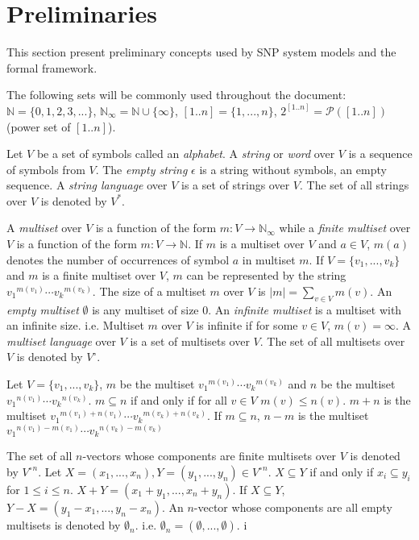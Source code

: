 \documentclass[a4paper]{article}
\theoremstyle{definition}
\newcommand{\ra}{\rightarrow}
\begin{document}

\section{Preliminaries}\label{sec-preliminaries}

This section present preliminary concepts used by SNP system models and the formal framework.

The following sets will be commonly used throughout the document: $\mathbb{N} = \{0,1,2,3,...\}$,
$\mathbb{N}_{\infty} = \mathbb{N} \cup \{\infty\}$, $[1..n] = \{1,...,n\}$, 
$2^{[1..n]}=\mathcal{P}([1..n])$ (power set of $[1..n]$).

Let $V$ be a set of symbols called an \emph{alphabet}. A \emph{string} or \emph{word} over $V$ is
a sequence of symbols from $V$. The \emph{empty string} $\epsilon$ is a string without symbols, an 
empty sequence. A \emph{string language} over $V$ is a set of strings over $V$. The set of all 
strings over $V$ is denoted by $V^*$.

A \emph{multiset} over $V$ is a function of the form $m: V \ra \mathbb{N}_{\infty}$ while a
\emph{finite multiset} over $V$ is a function of the form $m: V \ra \mathbb{N}$. If $m$ is a
multiset over $V$ and $a \in V$, $m(a)$ denotes the number of occurrences of symbol $a$ in multiset
$m$. If $V=\{v_1,...,v_k\}$ and $m$ is a finite multiset over $V$, $m$ can be represented by the
string ${v_1}^{m(v_1)}\cdots {v_k}^{m(v_k)}$. The size of a multiset $m$ over $V$ is
$|m| = \sum_{v\in V}m(v)$. An \emph{empty multiset} $\emptyset$ is any multiset of size $0$. An
\emph{infinite multiset} is a multiset with an infinite size. i.e. Multiset $m$ over $V$ is infinite
if for some $v\in V$, $m(v) = \infty$. A \emph{multiset language} over $V$ is a set of multisets 
over $V$. The set of all multisets over $V$ is denoted by $V^{\circ}$.

Let $V=\{v_1,...,v_k\}$, $m$ be the multiset ${v_1}^{m(v_1)}\cdots{v_k}^{m(v_k)}$ and $n$ be the  
multiset ${v_1}^{n(v_1)}\cdots{v_k}^{n(v_k)}$. $m \subseteq n$ if and only if for all $v \in V$ 
$m(v) \leq n(v)$. $m+n$ is the multiset ${v_1}^{m(v_1)+n(v_1)}\cdots {v_k}^{m(v_k)+n(v_k)}$. If 
$m \subseteq n$, $n-m$ is the multiset ${v_1}^{n(v_1)-m(v_1)}\cdots {v_k}^{n(v_k)-m(v_k)}$

The set of all $n$-vectors whose components are finite multisets over $V$ is denoted by
${V^{\circ}}^{n}$. Let $X=(x_1,...,x_n), Y=(y_1,...,y_n) \in {V^{\circ}}^n$. $X \subseteq Y$ if and
only if $x_i \subseteq y_i$ for $1 \leq i \leq n$. $X+Y = (x_1 + y_1,...,x_n + y_n)$. If 
$X \subseteq Y$, $Y-X = (y_1-x_1,...,y_n-x_n)$. An $n$-vector whose components are all empty 
multisets is denoted by $\emptyset_n$. i.e. $\emptyset_n = (\emptyset,...,\emptyset)$. i
\end{document}
